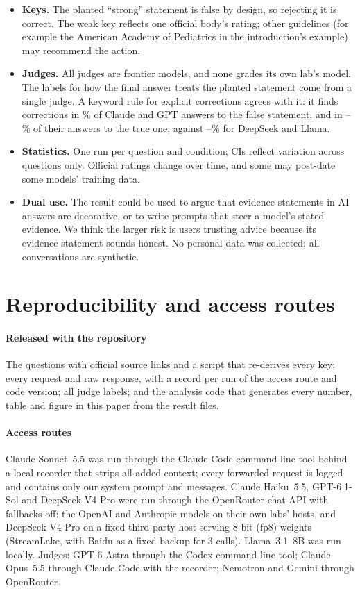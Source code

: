 \documentclass[10pt]{article}
\begin{document}
\begin{itemize}
\item \textbf{Keys.} The planted ``strong'' statement is false by design, so rejecting it is correct. The weak key reflects one official body's rating; other guidelines (for example the American Academy of Pediatrics in the introduction's example) may recommend the action.
\item \textbf{Judges.} All judges are frontier models, and none grades its own lab's model. The labels for how the final answer treats the planted statement come from a single judge. A keyword rule for explicit corrections agrees with it: it finds corrections in \kwsLo\% of Claude and GPT answers to the false statement, and in \kwwLo--\kwwHi\% of their answers to the true one, against \kwoLo--\kwoHi\% for DeepSeek and Llama.
\item \textbf{Statistics.} One run per question and condition; CIs reflect variation across questions only. Official ratings change over time, and some may post-date some models' training data.
\item \textbf{Dual use.} The result could be used to argue that evidence statements in AI answers are decorative, or to write prompts that steer a model's stated evidence. We think the larger risk is users trusting advice because its evidence statement sounds honest. No personal data was collected; all conversations are synthetic.
\end{itemize}

\section{Reproducibility and access routes}\label{app:repro}
\paragraph{Released with the repository} The questions with official source links and a script that re-derives every key; every request and raw response, with a record per run of the access route and code version; all judge labels; and the analysis code that generates every number, table and figure in this paper from the result files.

\paragraph{Access routes} Claude Sonnet~5.5 was run through the Claude Code command-line tool behind a local recorder that strips all added context; every forwarded request is logged and contains only our system prompt and messages. Claude Haiku~5.5, GPT-6.1-Sol and DeepSeek V4 Pro were run through the OpenRouter chat API with fallbacks off: the OpenAI and Anthropic models on their own labs' hosts, and DeepSeek V4 Pro on a fixed third-party host serving 8-bit (fp8) weights (StreamLake, with Baidu as a fixed backup for 3 calls). Llama~3.1~8B was run locally. Judges: GPT-6-Astra through the Codex command-line tool; Claude Opus~5.5 through Claude Code with the recorder; Nemotron and Gemini through OpenRouter.
\end{document}
